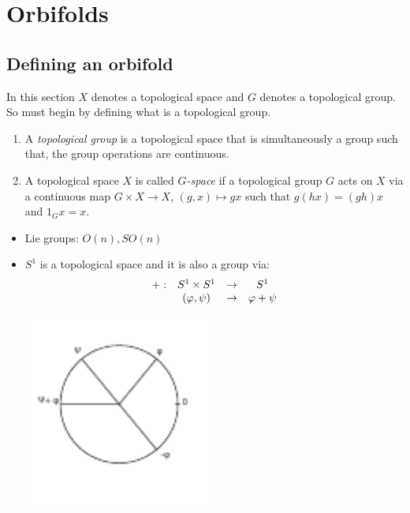\chapter{Orbifolds}


\section{Defining an orbifold}

In this section $X$ denotes a topological space and $G$ denotes a topological group. So must begin by defining what is a topological group.

\begin{defn}
\begin{enumerate}
\item A \emph{topological group} is a topological space that is simultaneously a group such that, the group operations are continuous.
\item A topological space $X$ is called \emph{$G$-space} if a topological group $G$ acts on $X$ via a continuous map
 $G\times X \longrightarrow X$, $(g,x)\longmapsto gx$ such that
  $g(hx)=(gh)x$ and $1_Gx=x$.
\end{enumerate}
\end{defn}

\begin{example}
\begin{itemize}
  \item Lie groups: $O(n), SO(n)$
  \item $S^1$ is a topological space and it is also a group via:
  $$\begin{array}[c]{cccc}
 +: &S^1\times S^1&{\rightarrow}&S^1\\
&(\varphi,\psi)&{\rightarrow}& \varphi +\psi
\end{array}$$
\begin{center}
\includegraphics[width=0.5\textwidth]{./suma}
\end{center}
\end{itemize}

\end{example}


